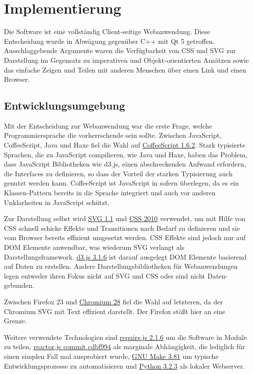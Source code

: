 \section{Implementierung}

Die Software ist eine vollständig Client-seitige Webanwendung. Diese
Entscheidung wurde in Abwägung gegenüber C++ mit Qt 5 getroffen.
Ausschlaggebende Argumente waren die Verfügbarkeit von CSS und SVG zur
Darstellung im Gegensatz zu imperativen und Objekt-orientierten Ansätzen
sowie das einfache Zeigen und Teilen mit anderen Menschen über einen
Link und einen Browser.

\subsection{Entwicklungsumgebung}

Mit der Entscheidung zur Webanwendung war die erste Frage, welche
Programmiersprache die vorherrschende sein sollte. Zwischen JavaScript,
CoffeeScript, Java und Haxe fiel die Wahl auf
\href{http://coffeescript.org/}{CoffeeScript 1.6.2}. Stark typisierte
Sprachen, die zu JavaScript compilieren, wie Java und Haxe, haben das
Problem, dass JavaScript Bibliotheken wie d3.js, einen abschreckenden
Aufwand erfordern, die Interfaces zu definieren, so dass der Vorteil der
starken Typisierung auch genutzt werden kann. CoffeeScript ist
JavaScript in sofern überlegen, da es ein Klassen-Pattern bereits in die
Sprache integriert und auch vor anderen Unklarheiten in JavaScript
schützt.

Zur Darstellung selbst wird \href{http://www.w3.org/TR/SVG11/}{SVG 1.1}
und \href{http://www.w3.org/TR/css-2010/}{CSS 2010} verwendet, um mit
Hilfe von CSS schnell schicke Effekte und Transitionen nach Bedarf zu
definieren und sie vom Browser bereits effizient umgesetzt werden. CSS
Effekte sind jedoch nur auf DOM Elemente anwendbar, was wiederum SVG
verlangt als Darstellungsframework. \href{http://d3js.org/}{d3.js 3.1.6}
ist darauf ausgelegt DOM Elemente basierend auf Daten zu erstellen.
Andere Darstellungsbibliotheken für Webanwendungen legen entweder ihren
Fokus nicht auf SVG und CSS oder sind nicht Daten-gebunden.

Zwischen Firefox 23 und \href{http://www.chromium.org/Home}{Chromium 28}
fiel die Wahl auf letzteren, da der Chromium SVG mit Text effizient
darstellt. Der Firefox stößt hier an eine Grenze.

Weitere verwendete Technologien sind
\href{http://requirejs.org/}{require.js 2.1.6} um die Software in Module
zu teilen, \href{https://github.com/fynyky/reactor.js}{reactor.js commit
cdbf994} als marginale Abhängigkeit, die lediglich für einen simplen
Fall mal ausprobiert wurde,
\href{https://www.gnu.org/software/make/}{GNU Make 3.81} um typische
Entwicklungsprozesse zu automatisieren und
\href{http://python.org/}{Python 3.2.3} als lokaler Webserver.

